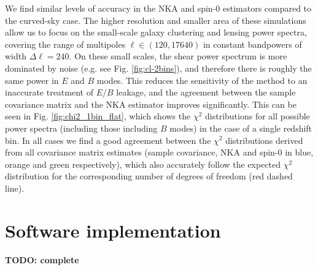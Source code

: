 \documentclass[a4paper,11pt]{article}
\newcommand{\todo}[1]{{\bf TODO: #1}}
\begin{document}
    We find similar levels of accuracy in the NKA and spin-0 estimators compared to the curved-sky case. The higher resolution and smaller area of these simulations allow us to focus on the small-scale galaxy clustering and lensing power spectra, covering the range of multipoles $\ell\in(120,17640)$ in constant bandpowers of width $\Delta \ell=240$. On these small scales, the shear power spectrum is more dominated by noise (e.g. see Fig. \ref{fig:cl-2bins}), and therefore there is roughly the same power in $E$ and $B$ modes. This reduces the sensitivity of the method to an inaccurate treatment of $E/B$ leakage, and the agreement between the sample covariance matrix and the NKA estimator improves significantly. This can be seen in Fig. \ref{fig:chi2_1bin_flat}, which shows the $\chi^2$ distributions for all possible power spectra (including those including $B$ modes) in the case of a single redshift bin. In all cases we find a good agreement between the $\chi^2$ distributions derived from all covariance matrix estimates (sample covariance, NKA and spin-0 in blue, orange and green respectively), which also accurately follow the expected $\chi^2$ distribution for the corresponding number of degrees of freedom (red dashed line).
    
  \section{Software implementation}\label{app:namaster}
    \todo{complete}

  
  
\end{document}
